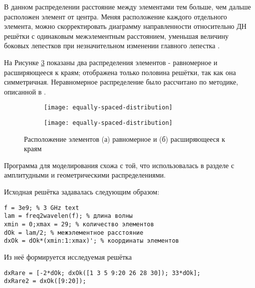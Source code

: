 В данном распределении расстояние между элементами тем больше, чем дальше расположен элемент от центра.
Меняя расположение каждого отдельного элемента, можно скорректировать диаграмму направленности
относительно ДН решётки с одинаковым межэлементным расстоянием, уменьшая величину боковых лепестков
при незначительном изменении главного лепестка \cite{harrington1961sidelobe}.

На Рисунке \ref{fig:sidewiding-distribution-harr} показаны два распределения элементов - равномерное и
расширяющееся к краям; отображена только половина решётки, так как она симметричная.
Неравномерное распределение было рассчитано по методике, описанной в \cite{harrington1961sidelobe}.

\begin{figure}[!ht]
    \centering
    \begin{subfigure}[b]{0.8\textwidth}
        \centering
        \texttt{[image: equally-spaced-distribution]}
        \caption{}%
        \label{fig:sidewiding-distribution-equal}
    \end{subfigure}
    \begin{subfigure}[b]{0.8\textwidth}
        \centering
        \texttt{[image: equally-spaced-distribution]}
        \caption{}%
        \label{fig:sidewiding-distribution-unequal}
    \end{subfigure}
    \caption{%
    Расположение элементов 
	(а) равномерное и 
	(б) расширяющееся к краям
    }%
    \label{fig:sidewiding-distribution-harr}
\end{figure}





Программа для моделирования схожа с той, что использовалась в разделе с амплитудными и геометрическими распределениями.

Исходная решётка задавалась следующим образом:


\begin{verbatim}
f = 3e9; % 3 GHz text
lam = freq2wavelen(f); % длина волны
xmin = 0;xmax = 29; % количество элементов
dOk = lam/2; % межэлементное расстояние
dxOk = dOk*(xmin:1:xmax)'; % координаты элементов     
\end{verbatim}

Из неё формируется исследуемая решётка

\begin{verbatim}
dxRare = [-2*dOk; dxOk([1 3 5 9:20 26 28 30]); 33*dOk];
dxRare2 = dxOk([9:20]);   
\end{verbatim}

